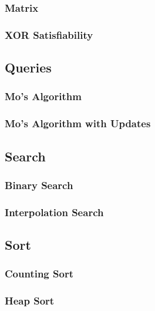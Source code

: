 \documentclass[8pt]{article}
\begin{document}
\subsubsection{Matrix}

\subsubsection{XOR Satisfiability}


\subsection{Queries}
\subsubsection{Mo's Algorithm}

\subsubsection{Mo's Algorithm with Updates}


\subsection{Search}
\subsubsection{Binary Search}

\subsubsection{Interpolation Search}


\subsection{Sort}
\subsubsection{Counting Sort}

\subsubsection{Heap Sort}

\end{document}
